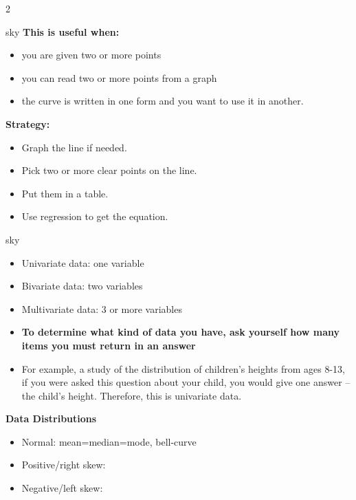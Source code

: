\documentclass[10pt]{article}
\begin{document}
\begin{multicols}{2}
\begin{skillbox}{sky}
            \textbf{This is useful when:}
            \begin{itemize}
                \item you are given two or more points
                \item you can read two or more points from a graph
                \item the curve is written in one form and you want to use it in another.
            \end{itemize}

            \textbf{Strategy:}
            \begin{itemize}[noitemsep, topsep=2pt]
                \item Graph the line if needed.
                \item Pick two or more clear points on the line.
                \item Put them in a table.
                \item Use regression to get the equation.
            \end{itemize}
        \end{skillbox}

        \begin{skillbox}{sky}
            \begin{itemize}
                \item Univariate data: one variable
                \item Bivariate data: two variables
                \item Multivariate data: 3 or more variables
                \item \textbf{To determine what kind of data you have, ask yourself how many items you must return in an answer}
                \item For example, a study of the distribution of children's heights from ages 8-13, if you were asked this question about your child, you would give one answer -- the child's height.  Therefore, this is univariate data.
            \end{itemize}
            \textbf{Data Distributions}
            \begin{itemize}
                \item Normal:  mean=median=mode, bell-curve
                \item Positive/right skew:
                \item Negative/left skew:
            \end{itemize}


\end{skillbox}
\end{multicols}
\end{document}
